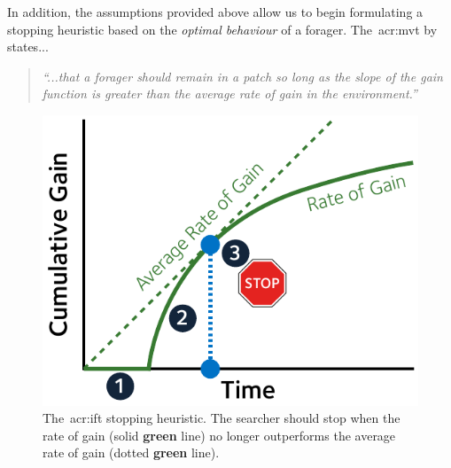 In addition, the assumptions provided above allow us to begin formulating a stopping heuristic based on the \emph{optimal behaviour} of a forager. The~\gls{acr:mvt} by~\cite{charnov1976mvt} states...

\begin{quote}
    \emph{``...that a forager should remain in a patch so long as the slope of the gain function is greater than the average rate of gain in the environment.''}
\end{quote}

\begin{figure}
    \begin{center}
    \vspace*{-7mm}
    \includegraphics[width=1\textwidth]{figures/ch3-ift_stop.pdf}
    \end{center}
    \vspace*{-4mm}
    \caption[Optimal \gls{acr:ift} stopping heuristic]{The~\gls{acr:ift} stopping heuristic. The searcher should stop when the rate of gain (solid \textbf{\color{dmax_green}green} line) no longer outperforms the average rate of gain (dotted \textbf{\color{dmax_green}green} line).}
    \label{fig:ift_stopping}
\end{figure}

